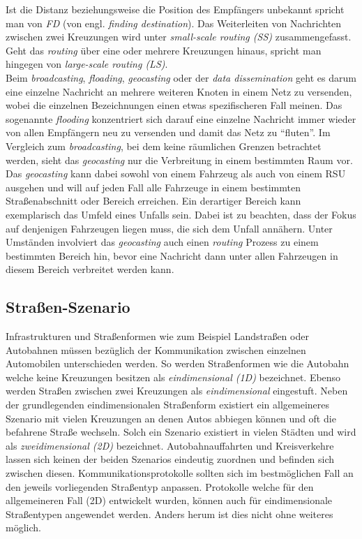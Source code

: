 \documentclass[english,runningheads,a4paper]{llncs}[2018/03/10]
\begin{document}
Ist die Distanz beziehungsweise die Position des Empfängers unbekannt spricht man von \textit{FD} (von engl. \textit{finding destination}).
Das Weiterleiten von Nachrichten zwischen zwei Kreuzungen wird unter \textit{small-scale routing (SS)} zusammengefasst.
Geht das \textit{routing} über eine oder mehrere Kreuzungen hinaus, spricht man hingegen von \textit{large-scale routing (LS)}\cite{conti2013mobile}.\\
Beim \textit{broadcasting}, \textit{floading}, \textit{geocasting} oder der \textit{data dissemination} geht es darum eine einzelne Nachricht an mehrere weiteren Knoten in einem Netz zu versenden, wobei die einzelnen Bezeichnungen einen etwas spezifischeren Fall meinen.
Das sogenannte \textit{flooding} konzentriert sich darauf eine einzelne Nachricht immer wieder von allen Empfängern neu zu versenden und damit das Netz zu ``fluten''.
Im Vergleich zum \textit{broadcasting}, bei dem keine räumlichen Grenzen betrachtet werden, sieht das \textit{geocasting} nur die Verbreitung in einem bestimmten Raum vor.
Das \textit{geocasting} kann dabei sowohl von einem Fahrzeug als auch von einem RSU ausgehen und will auf jeden Fall alle Fahrzeuge in einem bestimmten Straßenabschnitt oder Bereich erreichen.
Ein derartiger Bereich kann exemplarisch das Umfeld eines Unfalls sein.
Dabei ist zu beachten, dass der Fokus auf denjenigen Fahrzeugen liegen muss, die sich dem Unfall annähern.
Unter Umständen involviert das \textit{geocasting} auch einen \textit{routing} Prozess zu einem bestimmten Bereich hin, bevor eine Nachricht dann unter allen Fahrzeugen in diesem Bereich verbreitet werden kann\cite{conti2013mobile}.

\subsection{Straßen-Szenario}\label{subsec:strassen-szenario}
Infrastrukturen und Straßenformen wie zum Beispiel Landstraßen oder Autobahnen müssen bezüglich der Kommunikation zwischen einzelnen Automobilen unterschieden werden.
So werden Straßenformen wie die Autobahn welche keine Kreuzungen besitzen als \textit{eindimensional (1D)} bezeichnet.
Ebenso werden Straßen zwischen zwei Kreuzungen als \textit{eindimensional} eingestuft.
Neben der grundlegenden eindimensionalen Straßenform existiert ein allgemeineres Szenario mit vielen Kreuzungen an denen Autos abbiegen können und oft die befahrene Straße wechseln.
Solch ein Szenario existiert in vielen Städten und wird als \textit{zweidimensional (2D)} bezeichnet.
Autobahnauffahrten und Kreisverkehre lassen sich keinen der beiden Szenarios eindeutig zuordnen und befinden sich zwischen diesen.
Kommunikationsprotokolle sollten sich im bestmöglichen Fall an den jeweils vorliegenden Straßentyp anpassen.
Protokolle welche für den allgemeineren Fall (2D) entwickelt wurden, können auch für eindimensionale Straßentypen angewendet werden.
Anders herum ist dies nicht ohne weiteres möglich\cite{conti2013mobile}.
\end{document}
